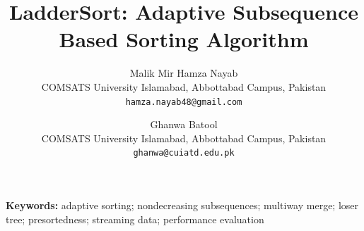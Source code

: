 \documentclass[11pt]{article}
\title{LadderSort: Adaptive Subsequence Based Sorting Algorithm}
\author{
  Malik Mir Hamza Nayab \\
  COMSATS University Islamabad, Abbottabad Campus, Pakistan \\
  \texttt{hamza.nayab48@gmail.com}
  \and
  Ghanwa Batool \\
  COMSATS University Islamabad, Abbottabad Campus, Pakistan \\
  \texttt{ghanwa@cuiatd.edu.pk}
}
\date{} %
\begin{document}
\maketitle

\noindent\textbf{Keywords:} adaptive sorting; nondecreasing subsequences; multiway merge; loser tree; presortedness; streaming data; performance evaluation

\vspace{1em}


\end{document}
